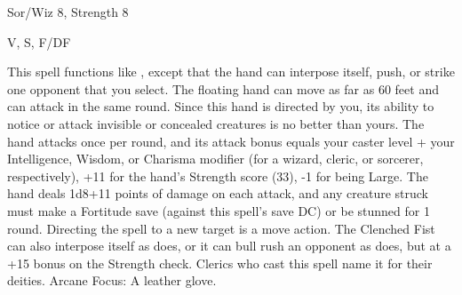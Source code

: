 
\begin{description*}
\item[Level:] Sor/Wiz 8, Strength 8
\item[Components:] V, S, F/DF
\end{description*}

This spell functions like , except that the hand can interpose
itself, push, or strike one opponent that you select. The floating hand can move
as far as 60 feet and can attack in the same round. Since this hand is directed
by you, its ability to notice or attack invisible or concealed creatures is no
better than yours.
The hand attacks once per round, and its attack bonus equals your caster level
+ your Intelligence, Wisdom, or Charisma modifier (for a wizard, cleric, or sorcerer,
respectively), +11 for the hand's Strength score (33), -1 for being Large. The
hand deals 1d8+11 points of damage on each attack, and any creature struck must
make a Fortitude save (against this spell's save DC) or be stunned for 1 round.
Directing the spell to a new target is a move action.
The Clenched Fist can also interpose itself as 
does, or it can bull rush an opponent as  does, but at a
+15 bonus on the Strength check.
Clerics who cast this spell name it for their deities.
Arcane Focus: A leather glove.